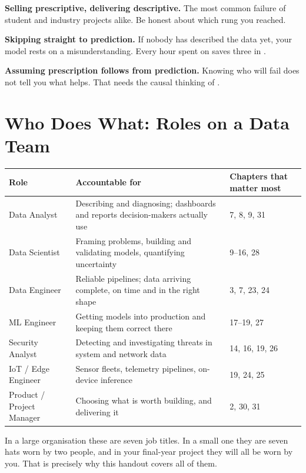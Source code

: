 \begin{pitfall}
\begin{tight}
  \item \textbf{Selling prescriptive, delivering descriptive.} The most common
        failure of student and industry projects alike. Be honest about which
        rung you reached.
  \item \textbf{Skipping straight to prediction.} If nobody has described the data
        yet, your model rests on a misunderstanding. Every hour spent on
         saves three in .
  \item \textbf{Assuming prescription follows from prediction.} Knowing who will
        fail does not tell you what helps. That needs the causal thinking of
        .
\end{tight}
\end{pitfall}

\section{Who Does What: Roles on a Data Team}

\begin{longtable}{@{}L{3.2cm}L{5.4cm}L{5.8cm}@{}}
\toprule
{}
\textbf{Role} & \textbf{Accountable for} & \textbf{Chapters that matter most} \\
\midrule
\endhead
Data Analyst & Describing and diagnosing; dashboards and reports decision-makers actually use & 7, 8, 9, 31 \\
Data Scientist & Framing problems, building and validating models, quantifying uncertainty & 9--16, 28 \\
Data Engineer & Reliable pipelines; data arriving complete, on time and in the right shape & 3, 7, 23, 24 \\
ML Engineer & Getting models into production and keeping them correct there & 17--19, 27 \\
Security Analyst & Detecting and investigating threats in system and network data & 14, 16, 19, 26 \\
IoT / Edge Engineer & Sensor fleets, telemetry pipelines, on-device inference & 19, 24, 25 \\
Product / Project Manager & Choosing what is worth building, and delivering it & 2, 30, 31 \\
\bottomrule
\end{longtable}

\begin{conceptbox}
In a large organisation these are seven job titles. In a small one they are seven
hats worn by two people, and in your final-year project they will all be worn by
you. That is precisely why this handout covers all of them.
\end{conceptbox}

